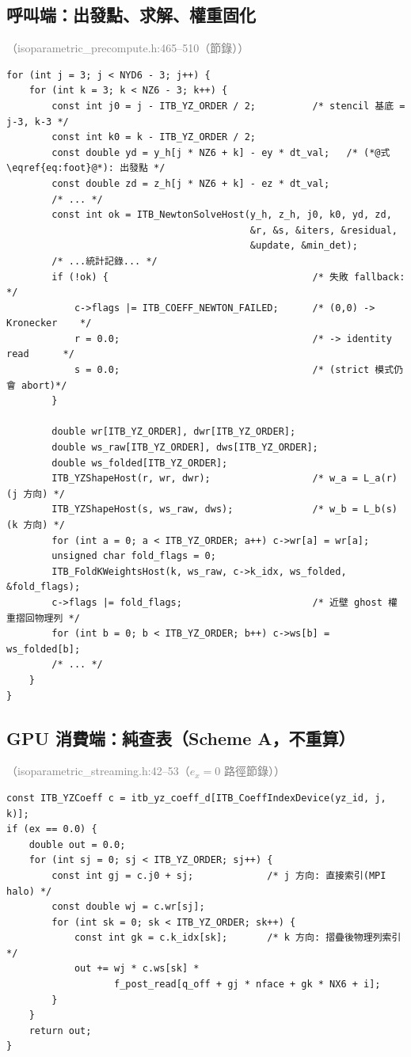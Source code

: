 \documentclass[11pt,a4paper]{article}
\newcommand{\filewhere}[1]{\textcolor{gray}{\small（#1）}}
\begin{document}
\subsection{呼叫端：出發點、求解、權重固化}
\filewhere{isoparametric\_precompute.h:465--510（節錄）}
\begin{lstlisting}[caption={每個 (class, j, k) 解一次；解完立刻把 $(r,s)$ 固化成權重表}]
for (int j = 3; j < NYD6 - 3; j++) {
    for (int k = 3; k < NZ6 - 3; k++) {
        const int j0 = j - ITB_YZ_ORDER / 2;          /* stencil 基底 = j-3, k-3 */
        const int k0 = k - ITB_YZ_ORDER / 2;
        const double yd = y_h[j * NZ6 + k] - ey * dt_val;   /* (*@式\eqref{eq:foot}@*): 出發點 */
        const double zd = z_h[j * NZ6 + k] - ez * dt_val;
        /* ... */
        const int ok = ITB_NewtonSolveHost(y_h, z_h, j0, k0, yd, zd,
                                           &r, &s, &iters, &residual,
                                           &update, &min_det);
        /* ...統計記錄... */
        if (!ok) {                                    /* 失敗 fallback:        */
            c->flags |= ITB_COEFF_NEWTON_FAILED;      /* (0,0) -> Kronecker    */
            r = 0.0;                                  /* -> identity read      */
            s = 0.0;                                  /* (strict 模式仍會 abort)*/
        }

        double wr[ITB_YZ_ORDER], dwr[ITB_YZ_ORDER];
        double ws_raw[ITB_YZ_ORDER], dws[ITB_YZ_ORDER];
        double ws_folded[ITB_YZ_ORDER];
        ITB_YZShapeHost(r, wr, dwr);                  /* w_a = L_a(r)  (j 方向) */
        ITB_YZShapeHost(s, ws_raw, dws);              /* w_b = L_b(s)  (k 方向) */
        for (int a = 0; a < ITB_YZ_ORDER; a++) c->wr[a] = wr[a];
        unsigned char fold_flags = 0;
        ITB_FoldKWeightsHost(k, ws_raw, c->k_idx, ws_folded, &fold_flags);
        c->flags |= fold_flags;                       /* 近壁 ghost 權重摺回物理列 */
        for (int b = 0; b < ITB_YZ_ORDER; b++) c->ws[b] = ws_folded[b];
        /* ... */
    }
}
\end{lstlisting}

\subsection{GPU 消費端：純查表（Scheme A，不重算）}
\filewhere{isoparametric\_streaming.h:42--53（$e_x=0$ 路徑節錄）}
\begin{lstlisting}[caption={device 每時間步只做查表乘加；Newton 與形狀函數一生只在初始化跑一次}]
const ITB_YZCoeff c = itb_yz_coeff_d[ITB_CoeffIndexDevice(yz_id, j, k)];
if (ex == 0.0) {
    double out = 0.0;
    for (int sj = 0; sj < ITB_YZ_ORDER; sj++) {
        const int gj = c.j0 + sj;             /* j 方向: 直接索引(MPI halo) */
        const double wj = c.wr[sj];
        for (int sk = 0; sk < ITB_YZ_ORDER; sk++) {
            const int gk = c.k_idx[sk];       /* k 方向: 摺疊後物理列索引 */
            out += wj * c.ws[sk] *
                   f_post_read[q_off + gj * nface + gk * NX6 + i];
        }
    }
    return out;
}
\end{lstlisting}
\end{document}
